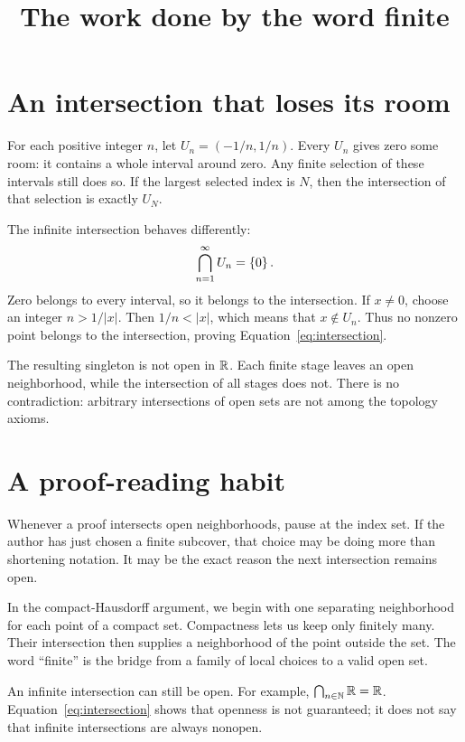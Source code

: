 \documentclass[11pt]{article}
\title{The work done by the word finite}
\begin{document}
\maketitle

\section{An intersection that loses its room}
For each positive integer $n$, let $U_n=(-1/n,1/n)$. Every $U_n$ gives
zero some room: it contains a whole interval around zero. Any finite
selection of these intervals still does so. If the largest selected
index is $N$, then the intersection of that selection is exactly
$U_N$.

The infinite intersection behaves differently:
\begin{equation}\label{eq:intersection}
  \bigcap_{n=1}^{\infty}U_n=\left\{0\right\}.
\end{equation}
Zero belongs to every interval, so it belongs to the intersection. If
$x\ne0$, choose an integer $n>1/|x|$. Then $1/n<|x|$, which means that
$x\notin U_n$. Thus no nonzero point belongs to the intersection,
proving Equation~\ref{eq:intersection}.

The resulting singleton is not open in $\mathbb{R}$. Each finite stage leaves
an open neighborhood, while the intersection of all stages does not.
There is no contradiction: arbitrary intersections of open sets are
not among the topology axioms.

\section{A proof-reading habit}
Whenever a proof intersects open neighborhoods, pause at the index set.
If the author has just chosen a finite subcover, that choice may be
doing more than shortening notation. It may be the exact reason the
next intersection remains open.

In the compact-Hausdorff argument, we begin with one separating
neighborhood for each point of a compact set. Compactness lets us keep
only finitely many. Their intersection then supplies a neighborhood
of the point outside the set. The word ``finite'' is the bridge from
a family of local choices to a valid open set.

\begin{remark}
An infinite intersection can still be open. For example,
$\bigcap_{n\in\mathbb{N}}\mathbb{R}=\mathbb{R}$. Equation~\ref{eq:intersection} shows that
openness is not guaranteed; it does not say that infinite
intersections are always nonopen.
\end{remark}
\end{document}
